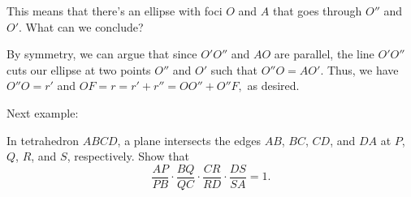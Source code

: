 





This means that there's an ellipse with foci $O$ and $A$ that goes through $O''$ and $O'.$ What can we conclude?





By symmetry, we can argue that since $O'O''$ and $AO$ are parallel, the line $O'O''$ cuts our ellipse at two points $O''$ and $O'$ such that $O''O = AO'.$ Thus, we have $O''O = r'$ and $OF = r = r' + r'' = OO'' + O''F,$ as desired.

Next example:

\begin{example}
In tetrahedron $ABCD$, a plane intersects the edges $AB$, $BC$, $CD$, and $DA$ at $P$, $Q$, $R$, and $S$, respectively. Show that
$$\frac{AP}{PB} \cdot \frac{BQ}{QC} \cdot \frac{CR}{RD} \cdot \frac{DS}{SA} = 1.$$    
\end{example}


